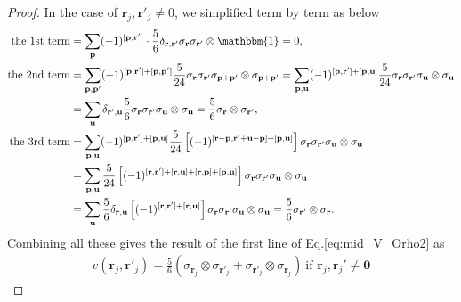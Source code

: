 \documentclass[aps,%
twocolumn,%
floatfix,%
pra,%
amsfonts,%
groupedaddress,%
superscriptaddress]{revtex4-2}%
\newcommand{\1}{\mathbbm{1}}
\begin{document}
\begin{proof}
    In the case of $\mathbf{r}_j,\mathbf{r}'_j \neq 0$, we simplified term by term as below
    \begin{align}
        \text{the 1st term} &= \sum_{\mathbf{p}} (-1)^{[\mathbf{p},\mathbf{r}']}\cdot \frac{5}{6} \delta_{\mathbf{r},\mathbf{r}'}\sigma_{\mathbf{r}}\sigma_{\mathbf{r}'} \otimes \1 =0, \\
        \text{the 2nd term} &= \sum_{\mathbf{p}, \mathbf{p}'}(-1)^{[\mathbf{p},\mathbf{r}']+[\mathbf{p},\mathbf{p}']} \frac{5}{24} \sigma_{\mathbf{r}} \sigma_{ \mathbf{r}'}\sigma_{\mathbf{p} + \mathbf{p}'} \otimes \sigma_{\mathbf{p}+\mathbf{p}'}= \sum_{\mathbf{p}, \mathbf{u}}(-1)^{[\mathbf{p}, \mathbf{r}']+[\mathbf{p},\mathbf{u}]} \frac{5}{24} \sigma_{\mathbf{r}} \sigma_{ \mathbf{r}'}\sigma_{\mathbf{u}} \otimes \sigma_{\mathbf{u}}\\ 
        &= \sum_{\mathbf{u}}\delta_{\mathbf{r}',\mathbf{u}} \frac{5}{6} \sigma_{\mathbf{r}} \sigma_{ \mathbf{r}'}\sigma_{\mathbf{u}} \otimes \sigma_{\mathbf{u}} = \frac{5}{6} \sigma_{\mathbf{r}} \otimes \sigma_{\mathbf{r}'},\\
        \text{the 3rd term} &= \sum_{\mathbf{p}, \mathbf{u}}(-1)^{[\mathbf{p}, \mathbf{r}']+[\mathbf{p},\mathbf{u}]} \frac{5}{24}\left[(-1)^{[\mathbf{r}+\mathbf{p},\mathbf{r}'+\mathbf{u}-\mathbf{p}]+[\mathbf{p},\mathbf{u}]}\right] \sigma_{\mathbf{r}}\sigma_{ \mathbf{r}'}\sigma_{\mathbf{u}} \otimes \sigma_{\mathbf{u}}\\
        &=\sum_{\mathbf{p}, \mathbf{u}}\frac{5}{24}\left[(-1)^{[\mathbf{r},\mathbf{r}']+[\mathbf{r},\mathbf{u}]+[\mathbf{r},\mathbf{p}]+[\mathbf{p},\mathbf{u}]}\right]\sigma_{\mathbf{r}}\sigma_{ \mathbf{r}'}\sigma_{\mathbf{u}} \otimes \sigma_{\mathbf{u}}\\
        &=\sum_{\mathbf{u}}\frac{5}{6}\delta_{\mathbf{r},\mathbf{u}}\left[(-1)^{[\mathbf{r},\mathbf{r}']+[\mathbf{r},\mathbf{u}]}\right]\sigma_{\mathbf{r}}\sigma_{ \mathbf{r}'}\sigma_{\mathbf{u}} \otimes \sigma_{\mathbf{u}} =\frac{5}{6}\sigma_{\mathbf{r}'} \otimes \sigma_{\mathbf{r}} .
    \end{align}
    Combining all these gives the result of the first line of Eq.\eqref{eq:mid_V_Orho2} as
    \begin{align}\label{eq:V_eq1}
       v({\mathbf{r}_j}, {\mathbf{r}'}_j) =\frac{5}{6}\left(\sigma_{\mathbf{r}_j}\otimes \sigma_{\mathbf{r}'_j} +\sigma_{\mathbf{r}'_j}\otimes \sigma_{\mathbf{r}_j} \right)~ \text{if~} \mathbf{r}_j, \mathbf{r}_j'  \neq \mathbf{0}
    \end{align} 
    

\end{proof}
\end{document}
